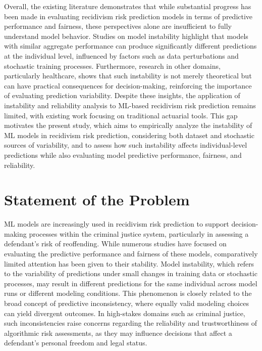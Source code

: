 \documentclass[12pt]{article}
\begin{document}
Overall, the existing literature demonstrates that while substantial progress has been made in evaluating recidivism risk prediction models in terms of predictive performance and fairness, these perspectives alone are insufficient to fully understand model behavior. Studies on model instability highlight that models with similar aggregate performance can produce significantly different predictions at the individual level, influenced by factors such as data perturbations and stochastic training processes. Furthermore, research in other domains, particularly healthcare, shows that such instability is not merely theoretical but can have practical consequences for decision-making, reinforcing the importance of evaluating prediction variability. Despite these insights, the application of instability and reliability analysis to ML-based recidivism risk prediction remains limited, with existing work focusing on traditional actuarial tools. This gap motivates the present study, which aims to empirically analyze the instability of ML models in recidivism risk prediction, considering both dataset and stochastic sources of variability, and to assess how such instability affects individual-level predictions while also evaluating model predictive performance, fairness, and reliability.


\section{Statement of the Problem} 
\tab ML models are increasingly used in recidivism risk prediction to support decision-making processes within the criminal justice system, particularly in assessing a defendant's risk of reoffending. While numerous studies have focused on evaluating the predictive performance and fairness of these models, comparatively limited attention has been given to their stability. Model instability, which refers to the variability of predictions under small changes in training data or stochastic processes, may result in different predictions for the same individual across model runs or different modeling conditions. This phenomenon is closely related to the broad concept of predictive inconsistency, where equally valid modeling choices can yield divergent outcomes. In high-stakes domains such as criminal justice, such inconsistencies raise concerns regarding the reliability and trustworthiness of algorithmic risk assessments, as they may influence decisions that affect a defendant's personal freedom and legal status.\\
\end{document}
